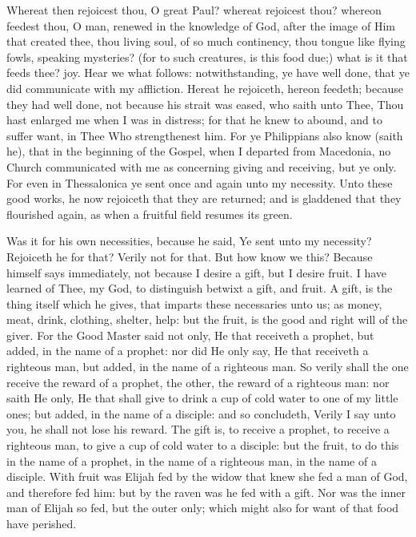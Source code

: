 \documentclass[b5paper,openright,12pt,twoside]{book}
\begin{document}
Whereat then rejoicest thou, O great Paul? whereat rejoicest thou?
whereon feedest thou, O man, renewed in the knowledge of God, after the
image of Him that created thee, thou living soul, of so much continency,
thou tongue like flying fowls, speaking mysteries? (for to such
creatures, is this food due;) what is it that feeds thee? joy. Hear
we what follows: notwithstanding, ye have well done, that ye did
communicate with my affliction. Hereat he rejoiceth, hereon feedeth;
because they had well done, not because his strait was eased, who saith
unto Thee, Thou hast enlarged me when I was in distress; for that he
knew to abound, and to suffer want, in Thee Who strengthenest him.
For ye Philippians also know (saith he), that in the beginning of the
Gospel, when I departed from Macedonia, no Church communicated with
me as concerning giving and receiving, but ye only. For even in
Thessalonica ye sent once and again unto my necessity. Unto these good
works, he now rejoiceth that they are returned; and is gladdened that
they flourished again, as when a fruitful field resumes its green.

Was it for his own necessities, because he said, Ye sent unto my
necessity? Rejoiceth he for that? Verily not for that. But how know we
this? Because himself says immediately, not because I desire a gift, but
I desire fruit. I have learned of Thee, my God, to distinguish betwixt
a gift, and fruit. A gift, is the thing itself which he gives, that
imparts these necessaries unto us; as money, meat, drink, clothing,
shelter, help: but the fruit, is the good and right will of the giver.
For the Good Master said not only, He that receiveth a prophet, but
added, in the name of a prophet: nor did He only say, He that receiveth
a righteous man, but added, in the name of a righteous man. So verily
shall the one receive the reward of a prophet, the other, the reward of
a righteous man: nor saith He only, He that shall give to drink a cup
of cold water to one of my little ones; but added, in the name of a
disciple: and so concludeth, Verily I say unto you, he shall not lose
his reward. The gift is, to receive a prophet, to receive a righteous
man, to give a cup of cold water to a disciple: but the fruit, to do
this in the name of a prophet, in the name of a righteous man, in the
name of a disciple. With fruit was Elijah fed by the widow that knew
she fed a man of God, and therefore fed him: but by the raven was he fed
with a gift. Nor was the inner man of Elijah so fed, but the outer only;
which might also for want of that food have perished.
\end{document}
